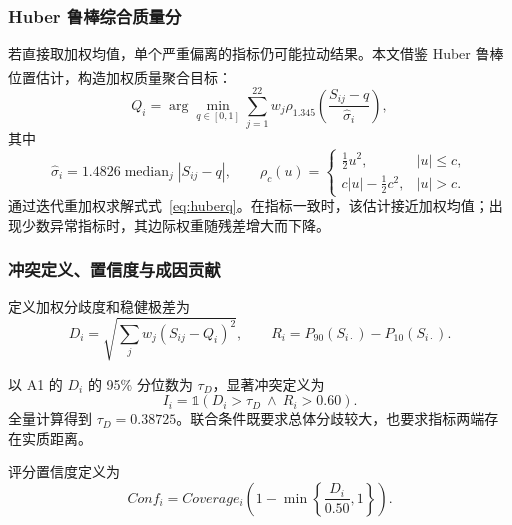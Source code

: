 \documentclass[bwprint]{gmcmthesis}
\numberwithin{equation}{section}
\numberwithin{figure}{section}
\numberwithin{table}{section}
\begin{document}
        \subsubsection{Huber 鲁棒综合质量分}   %
        若直接取加权均值，单个严重偏离的指标仍可能拉动结果。本文借鉴 Huber 鲁棒位置估计\textsuperscript{\cite{huber1964robust}}，构造加权质量聚合目标：
        \begin{equation}
        Q_i=\arg\min_{q\in[0,1]}\sum_{j=1}^{22}w_j
        \rho_{1.345}\!\left(\frac{S_{ij}-q}{\widehat\sigma_i}\right),
        \label{eq:huberq}
        \end{equation}
        其中
        \begin{equation}
        \widehat\sigma_i=1.4826\operatorname{median}_{j}|S_{ij}-q|,
        \qquad
        \rho_c(u)=\begin{cases}
        \tfrac12u^2,&|u|\le c,\\
        c|u|-\tfrac12c^2,&|u|>c.
        \end{cases}
        \label{eq:huber}
        \end{equation}
        通过迭代重加权求解式式~\eqref{eq:huberq}。在指标一致时，该估计接近加权均值；出现少数异常指标时，其边际权重随残差增大而下降。

        
        \subsubsection{冲突定义、置信度与成因贡献}   %
        定义加权分歧度和稳健极差为
        \begin{equation}
        D_i=\sqrt{\sum_jw_j(S_{ij}-Q_i)^2},\qquad
        R_i=P_{90}(S_{i\cdot})-P_{10}(S_{i\cdot}).
        \label{eq:disagreement}
        \end{equation}
        
        以 A1 的 $D_i$ 的 95\% 分位数为 $\tau_D$，显著冲突定义为
        \begin{equation}
        I_i=\mathds{1}(D_i>\tau_D\ \land\ R_i>0.60).
        \label{eq:conflict}
        \end{equation}
        全量计算得到 $\tau_D=0.38725$。联合条件既要求总体分歧较大，也要求指标两端存在实质距离。
        
        评分置信度定义为
        \begin{equation}
        Conf_i=Coverage_i\left(1-\min\left\{\frac{D_i}{0.50},1\right\}\right).
        \label{eq:confidence}
        \end{equation}
        
\end{document}

